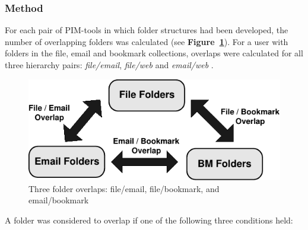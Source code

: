 \subsubsection{Method}

For each pair of PIM-tools in which folder structures had been developed, the number of overlapping folders was calculated (see \textbf{Figure~\ref{fig:exp-study:overlaps}}).  For a user with folders in the file, email and bookmark collections, overlaps were calculated for all three hierarchy pairs: \textit{file/email}, \textit{file/web} and \textit{email/web} .

\begin{figure}[hbtp]
	\begin{center}
		\leavevmode
			\includegraphics{pictures/exp-study/exp-study-Overlaps.pdf}
	\end{center}
	\caption{Three folder overlaps: file/email, file/bookmark, and email/bookmark}
	\label{fig:exp-study:overlaps}
\end{figure}

A folder was considered to overlap if one of the following three conditions held:

